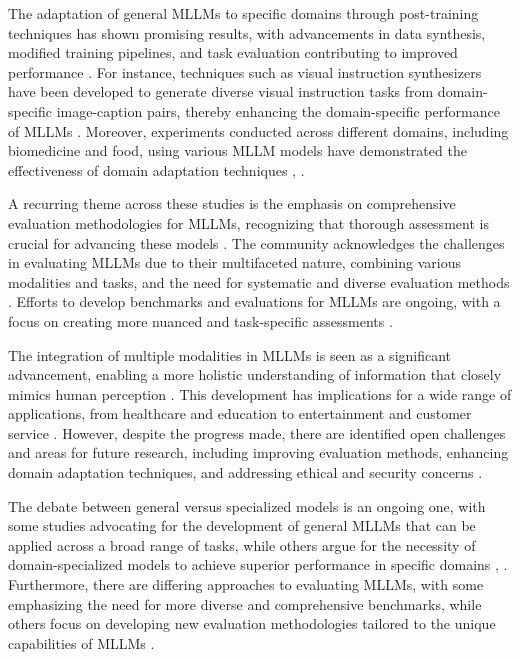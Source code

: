 \documentclass[conference]{IEEEtran}
\begin{document}
The adaptation of general MLLMs to specific domains through post-training techniques has shown promising results, with advancements in data synthesis, modified training pipelines, and task evaluation contributing to improved performance \cite{b6}. For instance, techniques such as visual instruction synthesizers have been developed to generate diverse visual instruction tasks from domain-specific image-caption pairs, thereby enhancing the domain-specific performance of MLLMs \cite{b7}. Moreover, experiments conducted across different domains, including biomedicine and food, using various MLLM models have demonstrated the effectiveness of domain adaptation techniques \cite{b8}, \cite{b9}.

A recurring theme across these studies is the emphasis on comprehensive evaluation methodologies for MLLMs, recognizing that thorough assessment is crucial for advancing these models \cite{b10}. The community acknowledges the challenges in evaluating MLLMs due to their multifaceted nature, combining various modalities and tasks, and the need for systematic and diverse evaluation methods \cite{b11}. Efforts to develop benchmarks and evaluations for MLLMs are ongoing, with a focus on creating more nuanced and task-specific assessments \cite{b12}.

The integration of multiple modalities in MLLMs is seen as a significant advancement, enabling a more holistic understanding of information that closely mimics human perception \cite{b13}. This development has implications for a wide range of applications, from healthcare and education to entertainment and customer service \cite{b14}. However, despite the progress made, there are identified open challenges and areas for future research, including improving evaluation methods, enhancing domain adaptation techniques, and addressing ethical and security concerns \cite{b15}.

The debate between general versus specialized models is an ongoing one, with some studies advocating for the development of general MLLMs that can be applied across a broad range of tasks, while others argue for the necessity of domain-specialized models to achieve superior performance in specific domains \cite{b16}, \cite{b17}. Furthermore, there are differing approaches to evaluating MLLMs, with some emphasizing the need for more diverse and comprehensive benchmarks, while others focus on developing new evaluation methodologies tailored to the unique capabilities of MLLMs \cite{b18}.
\end{document}
